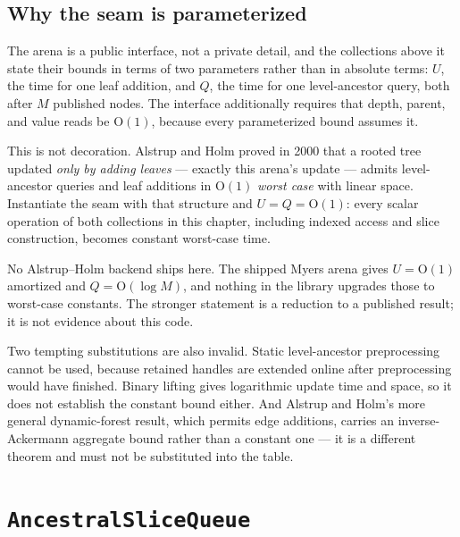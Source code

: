 \documentclass[11pt,twoside,openright]{book}
\newcommand{\code}[1]{\texorpdfstring{\textcolor{d7ink}{\texttt{#1}}}{#1}}
\newcommand{\bigoh}[1]{$\mathrm{O}(#1)$}
\begin{document}
\subsection{Why the seam is parameterized}

The arena is a public interface, not a private detail, and the collections above
it state their bounds in terms of two parameters rather than in absolute terms:
$U$, the time for one leaf addition, and $Q$, the time for one level-ancestor
query, both after $M$ published nodes. The interface additionally requires that
depth, parent, and value reads be \bigoh{1}, because every parameterized bound
assumes it.

This is not decoration. Alstrup and Holm proved in 2000 that a rooted tree
updated \emph{only by adding leaves} --- exactly this arena's update --- admits
level-ancestor queries and leaf additions in \bigoh{1} \emph{worst case} with
linear space. Instantiate the seam with that structure
and $U = Q = \mathrm{O}(1)$: every scalar operation of both collections in this
chapter, including indexed access and slice construction, becomes constant
worst-case time.

\begin{caveatbox}
No Alstrup--Holm backend ships here. The shipped Myers arena gives
$U = \mathrm{O}(1)$ amortized and $Q = \mathrm{O}(\log M)$, and nothing in the library
upgrades those to worst-case constants. The stronger statement is a reduction
to a published result; it is not evidence about this code.

Two tempting substitutions are also invalid. Static level-ancestor
preprocessing cannot be used, because retained handles are extended online after
preprocessing would have finished. Binary lifting gives logarithmic update time
and space, so it does not establish the constant bound either. And Alstrup and
Holm's more general dynamic-forest result, which permits edge additions, carries
an inverse-Ackermann aggregate bound rather than a constant one --- it is a
different theorem and must not be substituted into the table.
\end{caveatbox}

\section[The ancestral slice queue]{\code{AncestralSliceQueue}}
\end{document}
